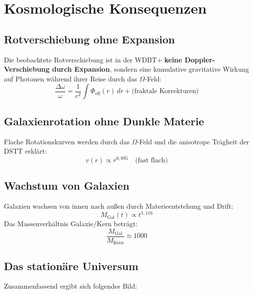 \documentclass[12pt,a4paper]{article}
\begin{document}
\section{Kosmologische Konsequenzen}

\subsection{Rotverschiebung ohne Expansion}

Die beobachtete Rotverschiebung ist in der WDBT+ \textbf{keine Doppler-Verschiebung durch Expansion}, sondern eine kumulative gravitative Wirkung auf Photonen während ihrer Reise durch das $\Omega$-Feld:
\begin{equation}
\frac{\Delta \omega}{\omega} = \frac{1}{c^2} \int \Phi_{\text{eff}}(r) \, dr + \text{(fraktale Korrekturen)}
\end{equation}

\subsection{Galaxienrotation ohne Dunkle Materie}

Flache Rotationskurven werden durch das $\Omega$-Feld und die anisotrope Trägheit der DSTT erklärt:
\begin{equation}
v(r) \propto r^{0,895} \quad \text{(fast flach)}
\end{equation}

\subsection{Wachstum von Galaxien}

Galaxien wachsen von innen nach außen durch Materieentstehung und Drift:
\begin{equation}
M_{\text{Gal}}(t) \propto t^{1,116}
\end{equation}
Das Massenverhältnis Galaxie/Kern beträgt:
\begin{equation}
\frac{M_{\text{Gal}}}{M_{\text{Kern}}} \approx 1000
\end{equation}

\subsection{Das stationäre Universum}

Zusammenfassend ergibt sich folgendes Bild:
\end{document}
